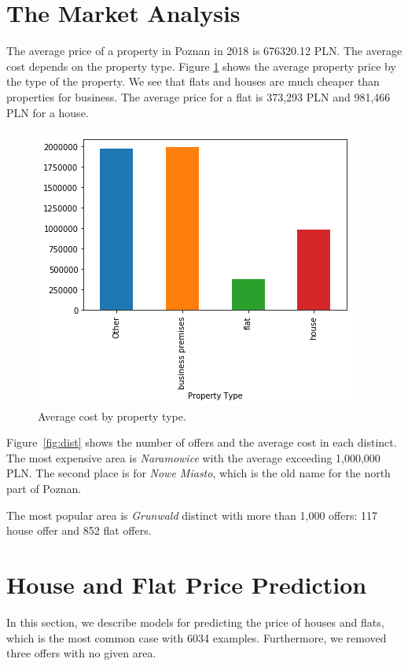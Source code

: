 \documentclass[11pt,a4paper]{article}
\begin{document}
\section{The Market Analysis}
The average price of a property in Poznan in 2018 is 676320.12 PLN. The average cost depends on the property type. Figure \ref{fig:cost} shows the average property price by the type of the property. We see that flats and houses are much cheaper than properties for business. The average price for a flat is 373,293 PLN and 981,466 PLN for a house.
\begin{figure}[htpb]
  \centering
  \includegraphics[width=0.8\linewidth]{./plots/prop_costs.png}
  \caption{Average cost by property type.}
  \label{fig:cost}
\end{figure}

Figure~\ref{fig:dist} shows the number of offers and the average cost in each distinct. The most expensive area is \emph{Naramowice} with the average exceeding 1,000,000 PLN.
The second place is for \emph{Nowe Miasto}, which is the old name for the north part of Poznan.

The most popular area is \emph{Grunwald} distinct with more than 1,000 offers: 117 house offer and 852 flat offers.


\section{House and Flat Price Prediction}
In this section, we describe models for predicting the price of houses and flats, which is the most common case with 6034 examples. Furthermore, we removed three offers with no given area. 
\end{document}
